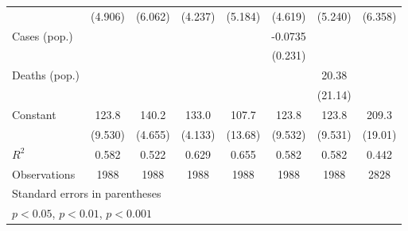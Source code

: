 \documentclass{article}
\begin{document}
{\begin{longtable}{l*{7}{c}}
                &  (4.906)         &  (6.062)         &  (4.237)         &  (5.184)         &  (4.619)         &  (5.240)         &  (6.358)         \\
Cases (pop.)    &                  &                  &                  &                  &  -0.0735         &                  &                  \\
                &                  &                  &                  &                  &  (0.231)         &                  &                  \\
Deaths (pop.)   &                  &                  &                  &                  &                  &    20.38         &                  \\
                &                  &                  &                  &                  &                  &  (21.14)         &                  \\
Constant        &    123.8\sym{***}&    140.2\sym{***}&    133.0\sym{***}&    107.7\sym{***}&    123.8\sym{***}&    123.8\sym{***}&    209.3\sym{***}\\
                &  (9.530)         &  (4.655)         &  (4.133)         &  (13.68)         &  (9.532)         &  (9.531)         &  (19.01)         \\
\hline
\(R^{2}\)       &    0.582         &    0.522         &    0.629         &    0.655         &    0.582         &    0.582         &    0.442         \\
Observations    &     1988         &     1988         &     1988         &     1988         &     1988         &     1988         &     2828         \\
\hline\hline
\multicolumn{8}{l}{\footnotesize Standard errors in parentheses}\\
\multicolumn{8}{l}{\footnotesize \sym{*} \(p<0.05\), \sym{**} \(p<0.01\), \sym{***} \(p<0.001\)}\\
\end{longtable}
}
\end{document}

